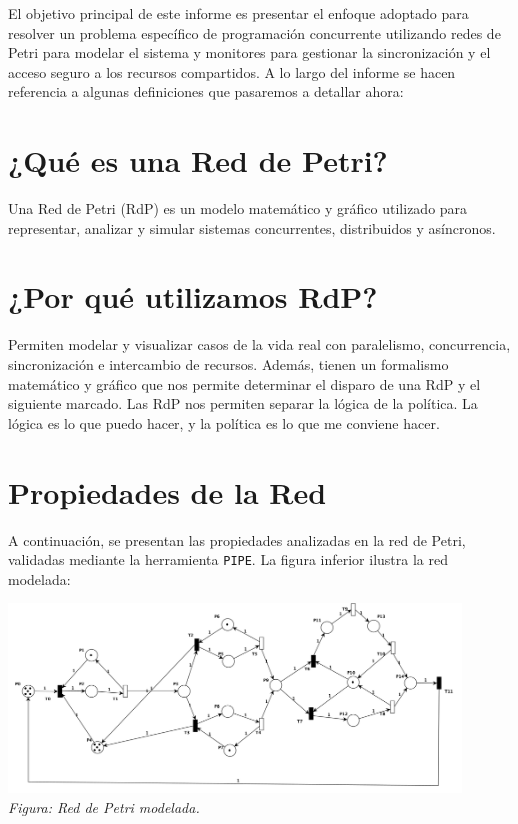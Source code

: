 \documentclass[12pt]{article}
\begin{document}
El objetivo principal de este informe es presentar el enfoque adoptado para resolver un problema específico de programación concurrente utilizando redes de Petri para modelar el sistema y monitores para gestionar la sincronización y el acceso seguro a los recursos compartidos. A lo largo del informe se hacen referencia a algunas definiciones que pasaremos a detallar ahora:

\newpage

\section{¿Qué es una Red de Petri?}
Una Red de Petri (RdP) es un modelo matemático y gráfico utilizado para representar, analizar y simular sistemas concurrentes, distribuidos y asíncronos.

\section{¿Por qué utilizamos RdP?}
Permiten modelar y visualizar casos de la vida real con paralelismo, concurrencia, sincronización e intercambio de recursos. Además, tienen un formalismo matemático y gráfico que nos permite determinar el disparo de una RdP y el siguiente marcado. Las RdP nos permiten separar la lógica de la política. La lógica es lo que puedo hacer, y la política es lo que me conviene hacer.

\section{Propiedades de la Red}
A continuación, se presentan las propiedades analizadas en la red de Petri, validadas mediante la herramienta \texttt{PIPE}. La figura inferior ilustra la red modelada:

\begin{center}
    \includegraphics[width=0.9\textwidth]{Petri-Net.png}\\[0.5em]
    \textit{Figura: Red de Petri modelada.}
\end{center}
\end{document}

